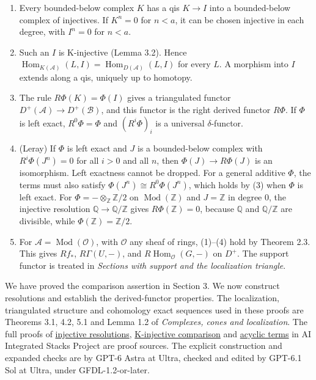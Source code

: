 \documentclass[
  english,
  11pt,
  a4paper,
]{article}
\providecommand{\tightlist}{%
  \setlength{\itemsep}{0pt}\setlength{\parskip}{0pt}}
\begin{document}
\begin{enumerate}
\tightlist
\item
  Every bounded-below complex \(K\) has a qis \(K\to I\) into a
  bounded-below complex of injectives. If \(K^n=0\) for \(n<a\), it can
  be chosen injective in each degree, with \(I^n=0\) for \(n<a\).
\item
  Such an \(I\) is K-injective (Lemma 3.2). Hence
  \(\operatorname{Hom}_{K(\mathcal A)}(L,I)=\operatorname{Hom}_{D(\mathcal A)}(L,I)\)
  for every \(L\). A morphism into \(I\) extends along a qis, uniquely
  up to homotopy.
\item
  The rule \(R\Phi(K)=\Phi(I)\) gives a triangulated functor
  \(D^+(\mathcal A)\to D^+(\mathcal B)\), and this functor is the right
  derived functor \(R\Phi\). If \(\Phi\) is left exact, \(R^0\Phi=\Phi\)
  and \((R^i\Phi)_i\) is a universal \(\delta\)-functor.
\item
  (Leray) If \(\Phi\) is left exact and \(J\) is a bounded-below complex
  with \(R^i\Phi(J^n)=0\) for all \(i>0\) and all \(n\), then
  \(\Phi(J)\to R\Phi(J)\) is an isomorphism. Left exactness cannot be
  dropped. For a general additive \(\Phi\), the terms must also satisfy
  \(\Phi(J^n)\cong R^0\Phi(J^n)\), which holds by (3) when \(\Phi\) is
  left exact. For \(\Phi=-\otimes_{\mathbb Z}\mathbb Z/2\) on
  \(\operatorname{Mod}(\mathbb Z)\) and \(J=\mathbb Z\) in degree \(0\),
  the injective resolution \(\mathbb Q\to\mathbb Q/\mathbb Z\) gives
  \(R\Phi(\mathbb Z)=0\), because \(\mathbb Q\) and
  \(\mathbb Q/\mathbb Z\) are divisible, while
  \(\Phi(\mathbb Z)=\mathbb Z/2\).
\item
  For \(\mathcal A=\operatorname{Mod}(\mathcal O)\), with \(\mathcal O\)
  any sheaf of rings, (1)--(4) hold by Theorem 2.3. This gives \(Rf_*\),
  \(R\Gamma(U,-)\), and \(R\operatorname{Hom}_{\mathcal O}(G,-)\) on
  \(D^+\). The support functor is treated in \emph{Sections with support
  and the localization triangle}.
\end{enumerate}

We have proved the comparison assertion in Section 3. We now construct
resolutions and establish the derived-functor properties. The
localization, triangulated structure and cohomology exact sequences used
in these proofs are Theorems 3.1, 4.2, 5.1 and Lemma 1.2 of
\emph{Complexes, cones and localization}. The full proofs of
\href{https://github.com/KokunoYumeto/unofficial-stacks-project-ai-drafts/blob/565b10e987aba5969b21145a0833f42d69f96790/derived.tex\#L6630}{injective
resolutions},
\href{https://github.com/KokunoYumeto/unofficial-stacks-project-ai-drafts/blob/565b10e987aba5969b21145a0833f42d69f96790/derived.tex\#L9987}{K-injective
comparison} and
\href{https://github.com/KokunoYumeto/unofficial-stacks-project-ai-drafts/blob/565b10e987aba5969b21145a0833f42d69f96790/derived.tex\#L6075}{acyclic
terms} in AI Integrated Stacks Project are proof sources. The explicit
construction and expanded checks are by GPT-6 Astra at Ultra, checked
and edited by GPT-6.1 Sol at Ultra, under GFDL-1.2-or-later.
\end{document}

